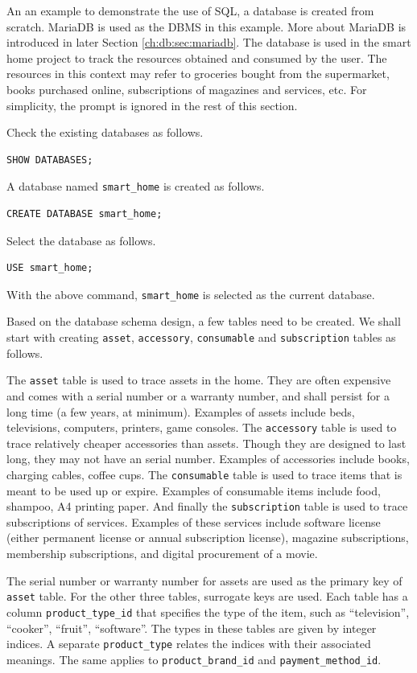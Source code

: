An an example to demonstrate the use of SQL, a database is created from scratch. MariaDB is used as the DBMS in this example. More about MariaDB is introduced in later Section \ref{ch:db:sec:mariadb}. The database is used in the smart home project to track the resources obtained and consumed by the user. The resources in this context may refer to groceries bought from the supermarket, books purchased online, subscriptions of magazines and services, etc. For simplicity, the prompt is ignored in the rest of this section.

Check the existing databases as follows.
\begin{lstlisting}
SHOW DATABASES;
\end{lstlisting}
A database named \verb|smart_home| is created as follows.
\begin{lstlisting}
CREATE DATABASE smart_home;
\end{lstlisting}
Select the database as follows.
\begin{lstlisting}
USE smart_home;
\end{lstlisting}
With the above command, \verb|smart_home| is selected as the current database.

Based on the database schema design, a few tables need to be created. We shall start with creating \verb|asset|, \verb|accessory|, \verb|consumable| and \verb|subscription| tables as follows.

The \verb|asset| table is used to trace assets in the home. They are often expensive and comes with a serial number or a warranty number, and shall persist for a long time (a few years, at minimum). Examples of assets include beds, televisions, computers, printers, game consoles. The \verb|accessory| table is used to trace relatively cheaper accessories than assets. Though they are designed to last long, they may not have an serial number. Examples of accessories include books, charging cables, coffee cups. The \verb|consumable| table is used to trace items that is meant to be used up or expire. Examples of consumable items include food, shampoo, A4 printing paper. And finally the \verb|subscription| table is used to trace subscriptions of services. Examples of these services include software license (either permanent license or annual subscription license), magazine subscriptions, membership subscriptions, and digital procurement of a movie.

The serial number or warranty number for assets are used as the primary key of \verb|asset| table. For the other three tables, surrogate keys are used. Each table has a column \verb|product_type_id| that specifies the type of the item, such as ``television'', ``cooker'', ``fruit'', ``software''. The types in these tables are given by integer indices. A separate \verb|product_type| relates the indices with their associated meanings. The same applies to \verb|product_brand_id| and \verb|payment_method_id|.

